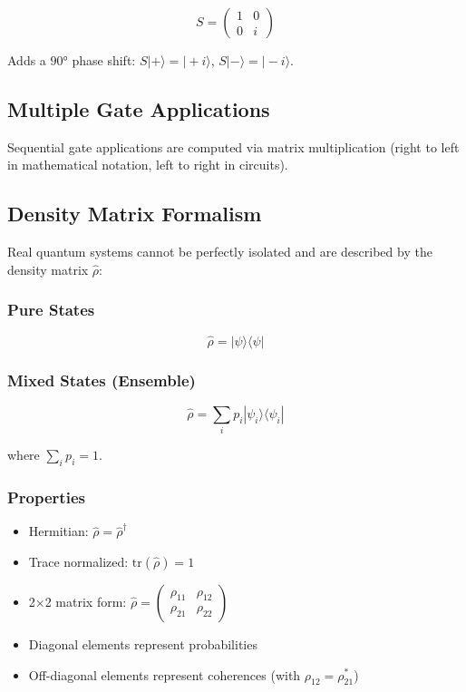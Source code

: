 \documentclass{article}
\begin{document}
$$S = \begin{pmatrix} 1 & 0 \\ 0 & i \end{pmatrix}$$

Adds a $90°$ phase shift: $S|+\rangle = |+i\rangle$, $S|-\rangle = |-i\rangle$.

\subsection{Multiple Gate Applications}

Sequential gate applications are computed via matrix multiplication (right to left in mathematical notation, left to right in circuits).

\subsection{Density Matrix Formalism}

Real quantum systems cannot be perfectly isolated and are described by the density matrix $\hat{\rho}$:

\subsubsection*{Pure States}
$$\hat{\rho} = |\psi\rangle\langle\psi|$$

\subsubsection*{Mixed States (Ensemble)}
$$\hat{\rho} = \sum_i p_i |\psi_i\rangle\langle\psi_i|$$

where $\sum_i p_i = 1$.

\subsubsection*{Properties}
\begin{itemize}
    \item Hermitian: $\hat{\rho} = \hat{\rho}^\dagger$
    \item Trace normalized: $\text{tr}(\hat{\rho}) = 1$
    \item 2×2 matrix form: $\hat{\rho} = \begin{pmatrix} \rho_{11} & \rho_{12} \\ \rho_{21} & \rho_{22} \end{pmatrix}$
    \item Diagonal elements represent probabilities
    \item Off-diagonal elements represent coherences (with $\rho_{12} = \rho_{21}^*$)
\end{itemize}
\end{document}
